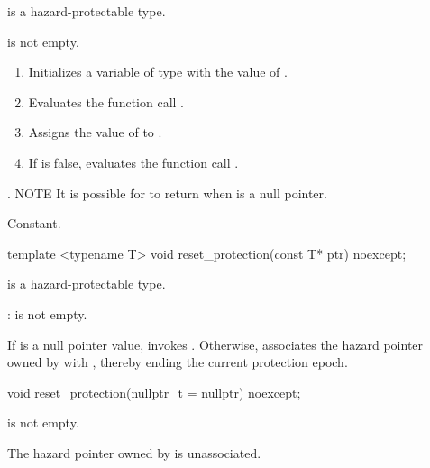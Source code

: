 \begin{itemdescr}

\mandates
{} is a hazard-protectable type.

\expects
{} is not empty.

\effects
\begin{enumerate}
\item Initializes a variable  of type  with the value of .
\item Evaluates the function call .
\item Assigns the value of  to .
\item If  is false, evaluates the function call .
\end{enumerate}

\returns
{}. NOTE It is possible for  to return  when  is a null pointer.

\complexity
Constant.

\end{itemdescr}

\begin{itemdecl}
template <typename T> void reset_protection(const T* ptr) noexcept;
\end{itemdecl}

\begin{itemdescr}

\mandates
{} is a hazard-protectable type.

{}: 
 is not empty.

\effects 
If  is a null pointer value, invokes . Otherwise, associates the hazard pointer owned by  with , thereby ending the current protection epoch.

\end{itemdescr}

\begin{itemdecl}
void reset_protection(nullptr_t = nullptr) noexcept;
\end{itemdecl}

\begin{itemdescr}

\expects
{} is not empty.

\ensures
The hazard pointer owned by  is unassociated.

\end{itemdescr}

